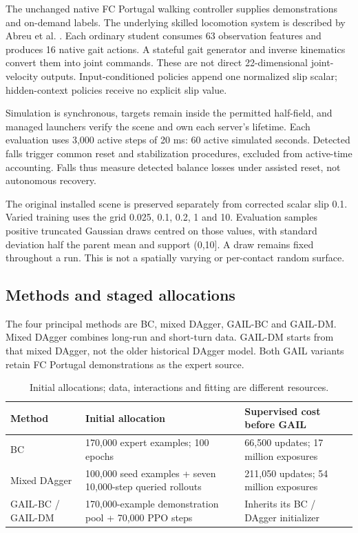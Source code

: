 \documentclass[10pt,a4paper,twocolumn]{article}
\begin{document}
The unchanged native FC Portugal walking controller supplies demonstrations and on-demand labels. The underlying skilled locomotion system is described by Abreu et al. \citep{abreu2025}. Each ordinary student consumes 63 observation features and produces 16 native gait actions. A stateful gait generator and inverse kinematics convert them into joint commands. These are not direct 22-dimensional joint-velocity outputs. Input-conditioned policies append one normalized slip scalar; hidden-context policies receive no explicit slip value.

Simulation is synchronous, targets remain inside the permitted half-field, and managed launchers verify the scene and own each server's lifetime. Each evaluation uses 3,000 active steps of 20 ms: 60 active simulated seconds. Detected falls trigger common reset and stabilization procedures, excluded from active-time accounting. Falls thus measure detected balance losses under assisted reset, not autonomous recovery.

The original installed scene is preserved separately from corrected scalar slip 0.1. Varied training uses the grid 0.025, 0.1, 0.2, 1 and 10. Evaluation samples positive truncated Gaussian draws centred on those values, with standard deviation half the parent mean and support (0,10]. A draw remains fixed throughout a run. This is not a spatially varying or per-contact random surface.

\subsection{Methods and staged allocations}

The four principal methods are BC, mixed DAgger, GAIL-BC and GAIL-DM. Mixed DAgger combines long-run and short-turn data. GAIL-DM starts from that mixed DAgger, not the older historical DAgger model. Both GAIL variants retain FC Portugal demonstrations as the expert source.

\begin{table}[t]\centering\small
\caption{Initial allocations; data, interactions and fitting are different resources.}
\begin{tabularx}{\textwidth}{lXX}\toprule
Method & Initial allocation & Supervised cost before GAIL \\
\midrule
BC & 170,000 expert examples; 100 epochs & 66,500 updates; 17 million exposures \\
Mixed DAgger & 100,000 seed examples + seven 10,000-step queried rollouts & 211,050 updates; 54 million exposures \\
GAIL-BC / GAIL-DM & 170,000-example demonstration pool + 70,000 PPO steps & Inherits its BC / DAgger initializer \\
\bottomrule\end{tabularx}\end{table}
\end{document}
